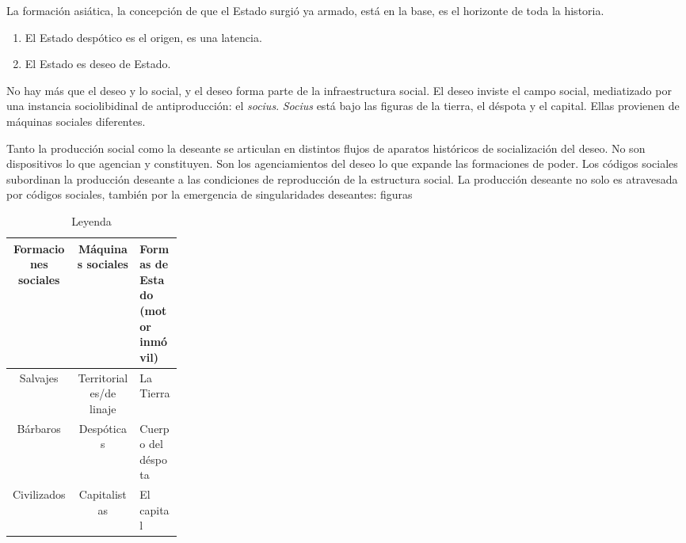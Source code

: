 La formación asiática, la concepción de que el Estado surgió ya armado, está en la base, es el horizonte de toda la historia.

\begin{enumerate}[labelindent=\parindent, leftmargin=*, label=\roman*., widest=ii, align=left]
  \item El Estado despótico es el origen, es una latencia.
  \item El Estado es deseo de Estado.
\end{enumerate}

No hay más que el deseo y lo social, y el deseo forma parte de la infraestructura social. El deseo inviste el campo social, mediatizado por una instancia sociolibidinal de antiproducción: el \emph{socius}. \emph{Socius} está bajo las figuras de la tierra, el déspota y el capital. Ellas provienen de máquinas sociales diferentes.

Tanto la producción social como la deseante se articulan en distintos flujos de aparatos históricos de socialización del deseo. No son dispositivos lo que agencian y constituyen. Son los agenciamientos del deseo lo que expande las formaciones de poder. Los códigos sociales subordinan la producción deseante a las condiciones de reproducción de la estructura social. La producción deseante no solo es atravesada por códigos sociales, también por la emergencia de singularidades deseantes: figuras 

\begin{table}[htb]
  \caption{Leyenda} %
  \label{tab:tablename}
  \centering
  \begin{tabular}{ccp{0.25\linewidth}}
    \toprule
    \textbf{Formaciones sociales} & \textbf{Máquinas sociales} & \textbf{Formas de Estado (motor inmóvil)}\\
    \midrule
    Salvajes & Territoriales/de linaje & La Tierra\\
    Bárbaros & Despóticas & Cuerpo del déspota\\
    Civilizados & Capitalistas & El capital\\
    \bottomrule
  \end{tabular}
\end{table}

